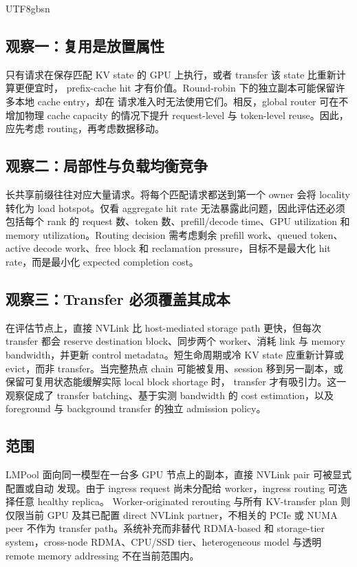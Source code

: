 \documentclass[11pt,a4paper]{article}
\newcommand{\sys}{LMPool}
\begin{document}
\begin{CJK*}{UTF8}{gbsn}
\subsection{观察一：复用是放置属性}

只有请求在保存匹配 KV state 的 GPU 上执行，或者 transfer 该 state 比重新计算更便宜时，
prefix-cache hit 才有价值。Round-robin 下的独立副本可能保留许多本地 cache entry，却在
请求准入时无法使用它们。相反，global router 可在不增加物理 cache capacity 的情况下提升
request-level 与 token-level reuse。因此，应先考虑 routing，再考虑数据移动。

\subsection{观察二：局部性与负载均衡竞争}

长共享前缀往往对应大量请求。将每个匹配请求都送到第一个 owner 会将 locality 转化为
load hotspot。仅看 aggregate hit rate 无法暴露此问题，因此评估还必须包括每个 rank 的
request 数、token 数、prefill/decode time、GPU utilization 和 memory utilization。Routing
decision 需考虑剩余 prefill work、queued token、active decode work、free block 和
reclamation pressure，目标不是最大化 hit rate，而是最小化 expected completion cost。

\subsection{观察三：Transfer 必须覆盖其成本}

在评估节点上，直接 NVLink 比 host-mediated storage path 更快，但每次 transfer 都会
reserve destination block、同步两个 worker、消耗 link 与 memory bandwidth，并更新 control
metadata。短生命周期或冷 KV state 应重新计算或 evict，而非 transfer。当完整热点 chain
可能被复用、session 移到另一副本，或保留可复用状态能缓解实际 local block shortage 时，
transfer 才有吸引力。这一观察促成了 transfer batching、基于实测 bandwidth 的 cost
estimation，以及 foreground 与 background transfer 的独立 admission policy。

\subsection{范围}

\sys{} 面向同一模型在一台多 GPU 节点上的副本，直接 NVLink pair 可被显式配置或自动
发现。由于 ingress request 尚未分配给 worker，ingress routing 可选择任意 healthy replica。
Worker-originated rerouting 与所有 KV-transfer plan 则仅限当前 GPU 及其已配置 direct NVLink
partner，不相关的 PCIe 或 NUMA peer 不作为 transfer path。系统补充而非替代 RDMA-based
和 storage-tier system，cross-node RDMA、CPU/SSD tier、heterogeneous model 与透明 remote
memory addressing 不在当前范围内。


\end{CJK*}
\end{document}
